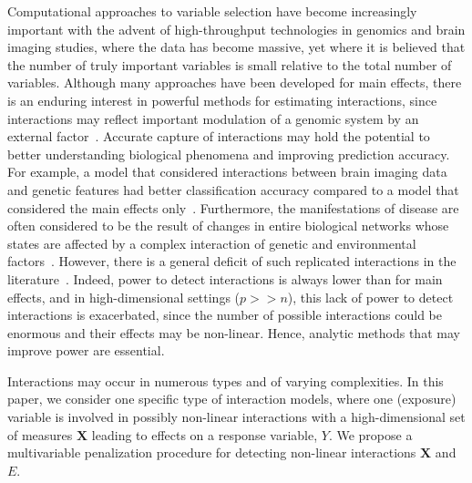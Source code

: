 \documentclass[12pt,letter]{article}\usepackage[]{graphicx}\usepackage[]{color}
\newcommand{\mb}[1]{\mathbf{#1}}
\begin{document}
Computational approaches to variable selection have become increasingly important with the advent of high-throughput technologies in genomics and brain imaging studies, where the data has become massive, yet where it is believed that the number of truly important variables is small relative to the total number of variables.
Although many approaches have been developed for main effects, there is an enduring interest in powerful methods for estimating interactions, since interactions may reflect important modulation of a genomic system by an external factor~\citep{bhatnagar2018analytic}.
Accurate capture of interactions may hold the potential to better understanding  biological phenomena and improving prediction accuracy.
For example, a model that considered interactions between brain imaging data and genetic features had better classification accuracy compared to a model that considered the main effects only~\citep{ning2018classifying}.
Furthermore, the manifestations of disease are often considered to be the result of changes in entire biological networks whose states are affected by a complex interaction of genetic and environmental factors~\citep{schadt2009molecular}.
However, there is a general deficit of such replicated interactions in the literature~\citep{timpson2018genetic}.
Indeed, power to detect interactions is always lower than for  main effects, and in high-dimensional settings ($p >> n$), this lack of power to detect interactions is exacerbated, since the number of possible interactions could be enormous and their effects may be non-linear. Hence, analytic methods that may improve power are essential.

Interactions may occur in numerous types and of varying complexities. In this paper, we consider one specific type of interaction models, where one (exposure) variable is involved in possibly non-linear interactions with a high-dimensional set of measures $\mb{X}$ leading to effects on a response variable, $Y$. We propose a multivariable penalization procedure for detecting non-linear interactions $\mb{X}$ and $E$.


\end{document}

